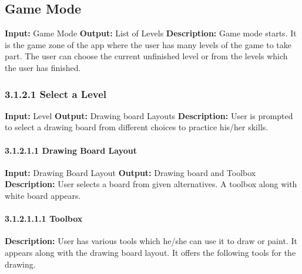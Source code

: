 \documentclass{scrreprt}
\begin{document}
\subsection{Game Mode}
\textbf{Input:} Game Mode \newline
\textbf{Output:} List of Levels
\vspace{1mm}\newline
\textbf{Description:} \newline 
Game mode starts. It is the game zone of the app where the user has many levels of the game to take part. The user can choose the current unfinished level or from the levels which the user has finished.

\subsubsection{3.1.2.1 Select a Level}
\textbf{Input:} Level \newline
\textbf{Output:} Drawing board Layouts
\vspace{1mm}\newline
\textbf{Description:} \newline 
User is prompted to select a drawing board from different choices to practice his/her skills.

\paragraph{3.1.2.1.1 Drawing Board Layout}
\hfill \vspace{2.5mm} \break 
\textbf{Input:} Drawing Board Layout \newline
\textbf{Output:} Drawing board and Toolbox
\vspace{1mm}\newline
\textbf{Description:} \newline 
User selects a board from given alternatives. A toolbox along with white board appears.

\paragraph{3.1.2.1.1.1 Toolbox}
\hfill \vspace{2.5mm} \break 
\textbf{Description:} \newline
User has various tools which
he/she can use it to draw or paint. It appears along with the drawing board layout. It offers the following tools for the drawing.
\end{document}
